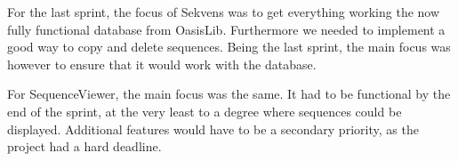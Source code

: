 For the last sprint, the focus of Sekvens was to get everything working the now fully functional database from OasisLib. Furthermore we needed to implement a good way to copy and delete sequences. Being the last sprint, the main focus was however to ensure that it would work with the database.

For SequenceViewer, the main focus was the same. It had to be functional by the end of the sprint, at the very least to a degree where sequences could be displayed. Additional features would have to be a secondary priority, as the project had a hard deadline.